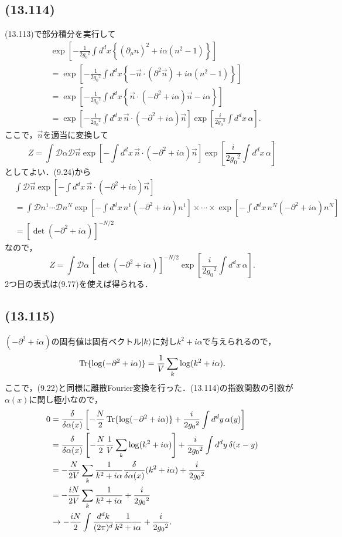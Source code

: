 \subsection{(13.114)}
(13.113)で部分積分を実行して
\begin{align*}
  & \exp \left[ - \frac{1}{2g_0{}^2} \int d^dx \left\{ (\partial_\mu n)^2 + i \alpha (n^2 - 1) \right\} \right] \\
  &= \exp \left[ - \frac{1}{2g_0{}^2} \int d^dx \left\{ - \vec{n} \cdot (\partial^2 \vec{n}) + i \alpha (n^2 - 1) \right\} \right] \\
  &= \exp \left[ - \frac{1}{2g_0{}^2} \int d^dx \left\{ \vec{n} \cdot (-\partial^2 + i \alpha) \vec{n} - i \alpha \right\} \right] \\
  &= \exp \left[ - \frac{1}{2g_0{}^2} \int d^dx \, \vec{n} \cdot (-\partial^2 + i \alpha) \vec{n} \right]
  \exp \left[ \frac{i}{2g_0{}^2} \int d^dx \, \alpha \right] .
\end{align*}
ここで，$\vec{n}$を適当に変換して
\[
Z = \int \mathcal{D}\alpha \mathcal{D}\vec{n} \exp \left[ - \int d^dx \, \vec{n} \cdot (-\partial^2 + i \alpha) \vec{n} \right]
\exp \left[ \frac{i}{2g_0{}^2} \int d^dx \, \alpha \right]
\]
としてよい．(9.24)から
\begin{align*}
  & \int \mathcal{D}\vec{n} \exp \left[ - \int d^dx \, \vec{n} \cdot (-\partial^2+ i \alpha) \vec{n} \right] \\
  &= \int \mathcal{D}n^1 \cdots \mathcal{D}n^N \exp \left[ - \int d^dx \, n^1 (-\partial^2 + i \alpha) n^1 \right] \times \cdots \times
  \exp \left[ - \int d^dx \, n^N (-\partial^2 + i \alpha) n^N \right] \\
  &= [\det(-\partial^2 + i \alpha)]^{-N/2}
\end{align*}
なので，
\[
Z = \int \mathcal{D}\alpha \, [\det(-\partial^2 + i \alpha)]^{-N/2}
\exp \left[ \frac{i}{2g_0{}^2} \int d^dx \, \alpha \right] .
\]
2つ目の表式は(9.77)を使えば得られる．

\subsection{(13.115)}
$(-\partial^2 + i\alpha)$の固有値は固有ベクトル$\ket{k}$に対し$k^2 + i\alpha$で与えられるので，
\[ \operatorname{Tr} \{ \log (-\partial^2 + i\alpha) \} = \frac{1}{V} \sum_k \log (k^2 + i\alpha) . \]
ここで，(9.22)と同様に離散Fourier変換を行った．(13.114)の指数関数の引数が$\alpha(x)$に関し極小なので，
\begin{align*}
  0 &= \frac{\delta}{\delta\alpha(x)} \left[ - \frac{N}{2} \operatorname{Tr} \{ \log (-\partial^2 + i\alpha) \}
  + \frac{i}{2g_0{}^2} \int d^dy \, \alpha(y) \right] \\
  &= \frac{\delta}{\delta\alpha(x)} \left[ - \frac{N}{2} \frac{1}{V} \sum_k \log (k^2 + i\alpha) \right]
  + \frac{i}{2g_0{}^2} \int d^dy \, \delta(x-y) \\
  &= - \frac{N}{2V} \sum_k \frac{1}{k^2 + i\alpha} \frac{\delta}{\delta\alpha(x)} (k^2 + i\alpha) + \frac{i}{2g_0{}^2} \\
  &= - \frac{iN}{2V} \sum_k \frac{1}{k^2 + i\alpha} + \frac{i}{2g_0{}^2} \\
  &\to - \frac{iN}{2} \int \frac{d^dk}{(2\pi)^d} \frac{1}{k^2 + i\alpha} + \frac{i}{2g_0{}^2} .
\end{align*}

